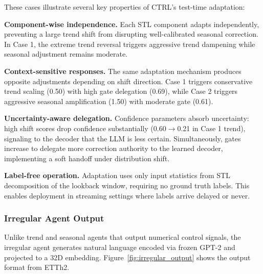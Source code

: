 These cases illustrate several key properties of CTRL's test-time adaptation:

\textbf{Component-wise independence.} Each STL component adapts independently, preventing a large trend shift from disrupting well-calibrated seasonal correction. In Case 1, the extreme trend reversal triggers aggressive trend dampening while seasonal adjustment remains moderate.

\textbf{Context-sensitive responses.} The same adaptation mechanism produces opposite adjustments depending on shift direction. Case 1 triggers conservative trend scaling (0.50) with high gate delegation (0.69), while Case 2 triggers aggressive seasonal amplification (1.50) with moderate gate (0.61).

\textbf{Uncertainty-aware delegation.} Confidence parameters absorb uncertainty: high shift scores drop confidence substantially (0.60$\rightarrow$0.21 in Case 1 trend), signaling to the decoder that the LLM is less certain. Simultaneously, gates increase to delegate more correction authority to the learned decoder, implementing a soft handoff under distribution shift.

\textbf{Label-free operation.} Adaptation uses only input statistics from STL decomposition of the lookback window, requiring no ground truth labels. This enables deployment in streaming settings where labels arrive delayed or never.


\subsubsection{Irregular Agent Output}

Unlike trend and seasonal agents that output numerical control signals, the irregular agent generates natural language encoded via frozen GPT-2 and projected to a 32D embedding. Figure~\ref{fig:irregular_output} shows the output format from ETTh2.


